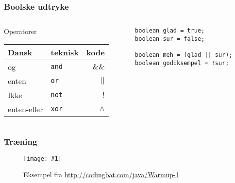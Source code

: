 \documentclass{beamer}
\newcommand{\FIG}[2]{
  \begin{figure}[]
    \centering
    \texttt{[image: \#1]}
    \caption{#2}
    \label{fig:#1}
  \end{figure}
}
\begin{document}
\begin{frame}[fragile]
  \frametitle{Boolske udtryke}
  \begin{columns}
    \begin{column}{0.5\textwidth}
      \begin{block}{Operatorer}
        \begin{table}[h]
          \centering
          \begin{tabular}{llr}
            Dansk & teknisk & kode \\
            \hline
            og & \texttt{and} & $\&\&$ \\
            enten & \texttt{or} & $|| $\\
            Ikke & \texttt{not} & $!$\\
            enten-eller & \texttt{xor} & $\wedge$\\
          \end{tabular}
        \end{table}
      \end{block}
    \end{column}
    \begin{column}{0.5\textwidth}
\begin{verbatim} 
boolean glad = true;
boolean sur = false;

boolean meh = (glad || sur);
boolean godEksempel = !sur;

\end{verbatim}
    \end{column}
  \end{columns}
\end{frame}



\begin{frame}
  \frametitle{Træning}

  \FIG{codingbat}{Eksempel fra \url{http://codingbat.com/java/Warmup-1}}

\end{frame}
\end{document}
